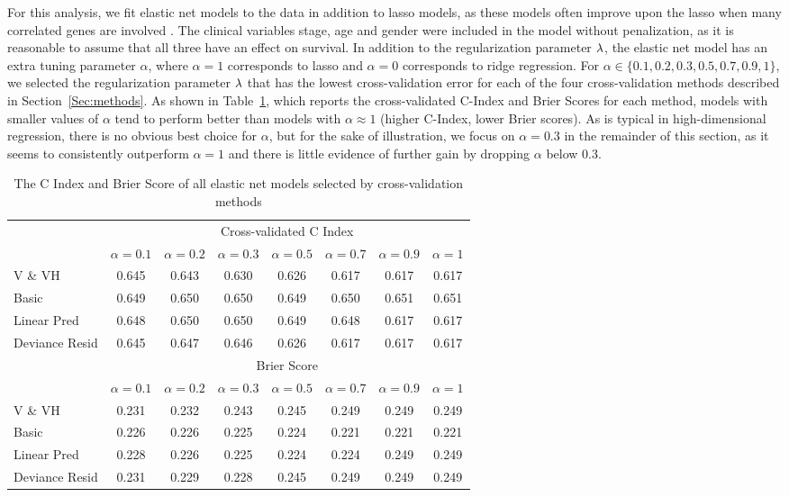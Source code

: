 For this analysis, we fit elastic net models to the data in addition to lasso models, as these models often improve upon the lasso when many correlated genes are involved \citep{Zou2005}. The clinical variables stage, age and gender were included in the model without penalization, as it is reasonable to assume that all three have an effect on survival. In addition to the regularization parameter $\lambda$, the elastic net model has an extra tuning parameter $\alpha$, where $\alpha=1$ corresponds to lasso and $\alpha=0$ corresponds to ridge regression. For $\alpha \in \{0.1, 0.2, 0.3, 0.5, 0.7, 0.9, 1\}$, we selected the regularization parameter $\lambda$ that has the lowest cross-validation error for each of the four cross-validation methods described in Section~\ref{Sec:methods}. As shown in Table~\ref{tb:shedden}, which reports the cross-validated C-Index and Brier Scores for each method, models with smaller values of $\alpha$ tend to perform better than models with $\alpha \approx 1$ (higher C-Index, lower Brier scores). As is typical in high-dimensional regression, there is no obvious best choice for $\alpha$, but for the sake of illustration, we focus on $\alpha=0.3$ in the remainder of this section, as it seems to consistently outperform $\alpha=1$ and there is little evidence of further gain by dropping $\alpha$ below 0.3.

\begin{table}[ht]
\centering
\caption{\label{tb:shedden} The C Index and Brier Score of all elastic net models selected by cross-validation methods }
\begin{tabular}{lccccccc}
\hline
  & \multicolumn{7}{c}{Cross-validated C Index} \\ 
  & $\alpha = 0.1$ & $\alpha = 0.2$ & $\alpha = 0.3$ & $\alpha = 0.5$ & $\alpha = 0.7$ & $\alpha = 0.9$ & $\alpha = 1$ \\ \cline{2-8}
V \& VH        & 0.645 &0.643 &0.630 &0.626 &0.617 &0.617 &0.617 \\
Basic          & 0.649 &0.650 &0.650 &0.649 &0.650 &0.651 &0.651 \\
Linear Pred    & 0.648 &0.650 &0.650 &0.649 &0.648 &0.617 &0.617 \\
Deviance Resid & 0.645 &0.647 &0.646 &0.626 &0.617 &0.617 &0.617 \\ 
\addlinespace
  & \multicolumn{7}{c}{Brier Score} \\ 
  & $\alpha = 0.1$ & $\alpha = 0.2$ & $\alpha = 0.3$ & $\alpha = 0.5$ & $\alpha = 0.7$ & $\alpha = 0.9$ & $\alpha = 1$ \\ \cline{2-8}
V \& VH        &0.231 &0.232 &0.243 &0.245 &0.249 &0.249 &0.249 \\
Basic          &0.226 &0.226 &0.225 &0.224 &0.221 &0.221 &0.221 \\
Linear Pred    &0.228 &0.226 &0.225 &0.224 &0.224 &0.249 &0.249 \\
Deviance Resid &0.231 &0.229 &0.228 &0.245 &0.249 &0.249 &0.249 \\ 
\hline
\end{tabular}
\end{table}

